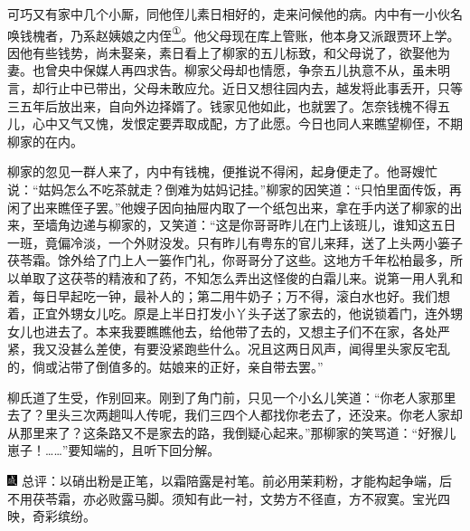 可巧又有家中几个小厮，同他侄儿素日相好的，走来问候他的病。内中有一小伙名唤钱槐者，乃系赵姨娘之内侄\href{../Text/part0064_split_000.html\#lnkback_1_a}{\textsuperscript{①}}。他父母现在库上管账，他本身又派跟贾环上学。因他有些钱势，尚未娶亲，素日看上了柳家的五儿标致，和父母说了，欲娶他为妻。也曾央中保媒人再四求告。柳家父母却也情愿，争奈五儿执意不从，虽未明言，却行止中已带出，父母未敢应允。近日又想往园内去，越发将此事丢开，只等三五年后放出来，自向外边择婿了。钱家见他如此，也就罢了。怎奈钱槐不得五儿，心中又气又愧，发恨定要弄取成配，方了此愿。今日也同人来瞧望柳侄，不期柳家的在内。

柳家的忽见一群人来了，内中有钱槐，便推说不得闲，起身便走了。他哥嫂忙说：``姑妈怎么不吃茶就走？倒难为姑妈记挂。''柳家的因笑道：``只怕里面传饭，再闲了出来瞧侄子罢。''他嫂子因向抽屉内取了一个纸包出来，拿在手内送了柳家的出来，至墙角边递与柳家的，又笑道：``这是你哥哥昨儿在门上该班儿，谁知这五日一班，竟偏冷淡，一个外财没发。只有昨儿有粤东的官儿来拜，送了上头两小篓子茯苓霜。馀外给了门上人一篓作门礼，你哥哥分了这些。这地方千年松柏最多，所以单取了这茯苓的精液和了药，不知怎么弄出这怪俊的白霜儿来。说第一用人乳和着，每日早起吃一钟，最补人的；第二用牛奶子；万不得，滚白水也好。我们想着，正宜外甥女儿吃。原是上半日打发小丫头子送了家去的，他说锁着门，连外甥女儿也进去了。本来我要瞧瞧他去，给他带了去的，又想主子们不在家，各处严紧，我又没甚么差使，有要没紧跑些什么。况且这两日风声，闻得里头家反宅乱的，倘或沾带了倒值多的。姑娘来的正好，亲自带去罢。''

柳氏道了生受，作别回来。刚到了角门前，只见一个小幺儿笑道：``你老人家那里去了？里头三次两趟叫人传呢，我们三四个人都找你老去了，还没来。你老人家却从那里来了？这条路又不是家去的路，我倒疑心起来。''那柳家的笑骂道：``好猴儿崽子！\ldots{}\ldots{}''要知端的，且听下回分解。

{\includegraphics[width=3mm]{../Images/00005}  \kaishu 总评：以硝出粉是正笔，以霜陪露是衬笔。前必用茉莉粉，才能构起争端，后不用茯苓霜，亦必败露马脚。须知有此一衬，文势方不径直，方不寂寞。宝光四映，奇彩缤纷。}


